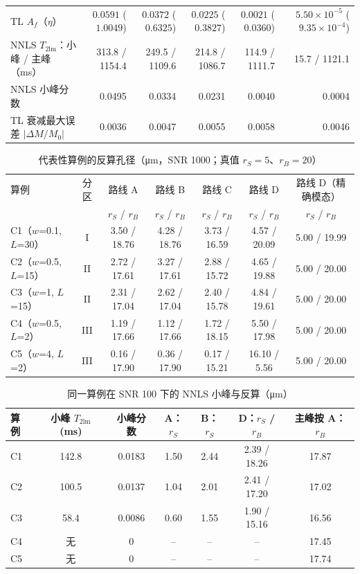 \begin{table}[htbp]
{\begin{tabular}{lrrrrr}
TL $A_f$（$\eta$） & $0.0591$ ($1.0049$) & $0.0372$ ($0.6325$) & $0.0225$ ($0.3827$) & $0.0021$ ($0.0360$) & $5.50\times10^{-5}$ ($9.35\times10^{-4}$) \\
NNLS $T_{2\mathrm{lm}}$：小峰 / 主峰（ms） & 313.8 / 1154.4 & 249.5 / 1109.6 & 214.8 / 1086.7 & 114.9 / 1111.7 & 15.7 / 1121.1 \\
NNLS 小峰分数 & 0.0495 & 0.0334 & 0.0231 & 0.0040 & 0.0004 \\
TL 衰减最大误差 $|\Delta M/M_0|$ & 0.0036 & 0.0047 & 0.0055 & 0.0058 & 0.0046 \\
\bottomrule\end{tabular}}\end{table}
\begin{table}[htbp]\centering\footnotesize\setlength{\tabcolsep}{4pt}
\caption{代表性算例的反算孔径（\si{\micro m}，SNR 1000；真值 $r_S=5$、$r_B=20$）}\label{tab:back}
\begin{tabular}{lcccccc}\toprule
算例 & 分区 & 路线 A & 路线 B & 路线 C & 路线 D & 路线 D（精确模态） \\
 & & $r_S$ / $r_B$ & $r_S$ / $r_B$ & $r_S$ / $r_B$ & $r_S$ / $r_B$ & $r_S$ / $r_B$ \\ \midrule
C1（$w$=0.1, $L$=30） & I & 3.50 / 18.76 & 4.28 / 18.76 & 3.73 / 16.59 & 4.57 / 20.09 & 5.00 / 19.99 \\
C2（$w$=0.5, $L$=15） & II & 2.72 / 17.61 & 3.27 / 17.61 & 2.88 / 15.72 & 4.65 / 19.88 & 5.00 / 20.00 \\
C3（$w$=1, $L$=15） & II & 2.31 / 17.04 & 2.62 / 17.04 & 2.40 / 15.78 & 4.84 / 19.61 & 5.00 / 20.00 \\
C4（$w$=0.5, $L$=2） & III & 1.19 / 17.66 & 1.12 / 17.66 & 1.72 / 18.15 & 5.50 / 17.98 & 5.00 / 20.00 \\
C5（$w$=4, $L$=2） & III & 0.16 / 17.90 & 0.36 / 17.90 & 0.17 / 15.21 & 16.10 / 5.56 & 5.00 / 20.00 \\
\bottomrule\end{tabular}\end{table}
\begin{table}[htbp]\centering\small
\caption{同一算例在 SNR 100 下的 NNLS 小峰与反算（\si{\micro m}）}\label{tab:snr}
\begin{tabular}{lcccccc}\toprule
算例 & 小峰 $T_{2\mathrm{lm}}$ (ms) & 小峰分数 & A：$r_S$ & B：$r_S$ & D：$r_S$ / $r_B$ & 主峰按 A：$r_B$ \\ \midrule
C1 & 142.8 & 0.0183 & 1.50 & 2.44 & 2.39 / 18.26 & 17.87 \\
C2 & 100.5 & 0.0137 & 1.04 & 2.01 & 2.41 / 17.20 & 17.02 \\
C3 & 58.4 & 0.0086 & 0.60 & 1.55 & 1.90 / 15.16 & 16.56 \\
C4 & 无 & 0 & -- & -- & -- & 17.45 \\
C5 & 无 & 0 & -- & -- & -- & 17.74 \\
\bottomrule\end{tabular}\end{table}
